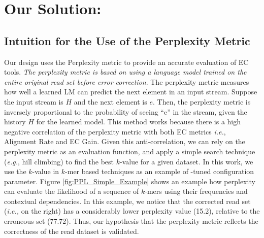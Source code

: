 \section{Our Solution: {\bf \name}}
\subsection{Intuition for the Use of the Perplexity Metric}
Our design uses the Perplexity metric to provide an accurate evaluation of EC tools. %
\textit{The perplexity metric is based on using a language model trained on the entire original read set before error correction}. 
The perplexity metric measures how well a learned LM can predict the next element in an input stream. Suppose the input stream is $H$ and the next element is $e$. Then, the perplexity metric is inversely proportional to the probability of seeing ``e'' in the stream, given the history $H$ for the learned model.
This method works because there is a high negative correlation of the perplexity metric with both EC metrics \textit{i.e.}, Alignment Rate and EC Gain.
Given this anti-correlation, we can rely on the perplexity metric as an evaluation function, and apply a simple search technique (\textit{e.g.}, hill climbing) to find the best $k$-value for a given dataset. In this work, we use the $k$-value in $k$-mer based techniques as an example of \name-tuned configuration parameter. %
Figure \ref{fig:PPL_Simple_Example} shows an example how perplexity can evaluate the likelihood of a sequence of $k$-mers using their frequencies and contextual dependencies. In this example, we notice that the corrected read set (\textit{i.e.,} on the right) has a considerably lower perplexity value (15.2), relative to the erroneous set (77.72). Thus, our hypothesis that the perplexity metric reflects the correctness of the read dataset is validated.

